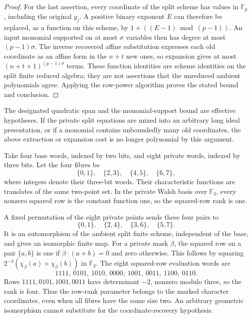 \begin{proof}
For the last assertion, every coordinate of the split scheme has values in $\mathbb F_p$, including the original $y_j$. A positive binary exponent $E$ can therefore be replaced, as a function on this scheme, by $1+((E-1)\bmod(p-1))$. An input monomial supported on at most $\sigma$ variables then has degree at most $(p-1)\sigma$. The inverse recovered affine substitution expresses each old coordinate as an affine form in the $n+t$ new ones, so expansion gives at most $(n+t+1)^{(p-1)\sigma}$ terms. These function identities are scheme identities on the split finite reduced algebra; they are not assertions that the unreduced ambient polynomials agree. Applying the row-power algorithm proves the stated bound and conclusion.
\end{proof}

The designated quadratic span and the monomial-support bound are effective hypotheses. If the private split equations are mixed into an arbitrary long ideal presentation, or if a monomial contains unboundedly many old coordinates, the above extraction or expansion cost is no longer polynomial by this argument.

\begin{example}
\label{st:rank-counterexample}
Take four base words, indexed by two bits, and eight private words, indexed by three bits. Let the four fibres be
\[
 \{0,1\},\quad\{2,3\},\quad\{4,5\},\quad\{6,7\},
\]
where integers denote their three-bit words. Their characteristic functions are translates of the same two-point set. In the private Walsh basis over $\mathbb F_3$, every nonzero squared row is the constant function one, so the squared-row rank is one.

A fixed permutation of the eight private points sends these four pairs to
\[
 \{0,1\},\quad\{2,4\},\quad\{3,6\},\quad\{5,7\}.
\]
It is an automorphism of the ambient split finite scheme, independent of the base, and gives an isomorphic finite map. For a private mask $\beta$, the squared row on a pair $\{a,b\}$ is one if $\beta\cdot(a+b)=0$ and zero otherwise. This follows by squaring $2^{-3}(\chi_\beta(a)+\chi_\beta(b))$ in $\mathbb F_3$. The eight squared-row evaluation words are
\[
1111,\ 0101,\ 1010,\ 0000,\ 1001,\ 0011,\ 1100,\ 0110.
\]
Rows $1111,0101,1001,0011$ have determinant $-2$, nonzero modulo three, so the rank is four. Thus the row-rank parameter belongs to the marked character coordinates, even when all fibres have the same size two. An arbitrary geometric isomorphism cannot substitute for the coordinate-recovery hypothesis.
\end{example}


